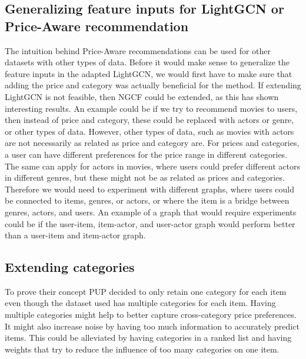 \subsection{Generalizing feature inputs for LightGCN or Price-Aware recommendation}
The intuition behind Price-Aware recommendations can be used for other datasets with other types of data.
Before it would make sense to generalize the feature inputs in the adapted LightGCN, we would first have to make sure that adding the price and category was actually beneficial for the method.
If extending LightGCN is not feasible, then NGCF could be extended, as this has shown interesting results.
An example could be if we try to recommend movies to users, then instead of price and category, these could be replaced with actors or genre, or other types of data.
However, other types of data, such as movies with actors are not necessarily as related as price and category are.
For prices and categories, a user can have different preferences for the price range in different categories.
The same can apply for actors in movies, where users could prefer different actors in different genres, but these might not be as related as prices and categories.
Therefore we would need to experiment with different graphs, where users could be connected to items, genres, or actors, or where the item is a bridge between genres, actors, and users.
An example of a graph that would require experiments could be if the user-item, item-actor, and user-actor graph would perform better than a user-item and item-actor graph.

\subsection{Extending categories}
To prove their concept PUP decided to only retain one category for each item even though the dataset used has multiple categories for each item.
Having multiple categories might help to better capture cross-category price preferences.
It might also increase noise by having too much information to accurately predict items.
This could be alleviated by having categories in a ranked list and having weights that try to reduce the influence of too many categories on one item.
